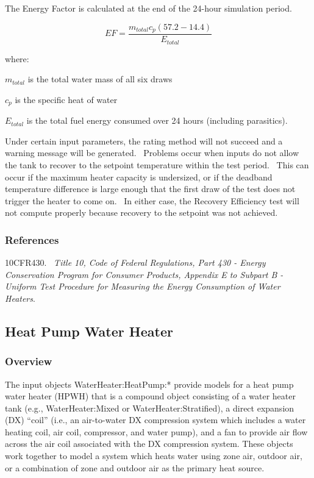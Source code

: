 The Energy Factor is calculated at the end of the 24-hour simulation period.

\begin{equation}
EF = \frac{{{m_{total}}{c_p}\left( {57.2 - 14.4} \right)}}{{{E_{total}}}}
\end{equation}

where:

\(m_{total}\) is the total water mass of all six draws

\(c_{p}\) is the specific heat of water

\(E_{total}\) is the total fuel energy consumed over 24 hours (including parasitics).

Under certain input parameters, the rating method will not succeed and a warning message will be generated.~ Problems occur when inputs do not allow the tank to recover to the setpoint temperature within the test period.~ This can occur if the maximum heater capacity is undersized, or if the deadband temperature difference is large enough that the first draw of the test does not trigger the heater to come on.~ In either case, the Recovery Efficiency test will not compute properly because recovery to the setpoint was not achieved.

\subsubsection{References}\label{references-053}

10CFR430.~ \emph{Title 10, Code of Federal Regulations, Part 430 - Energy Conservation Program for Consumer Products, Appendix E to Subpart B - Uniform Test Procedure for Measuring the Energy Consumption of Water Heaters}.

\subsection{Heat Pump Water Heater}\label{heat-pump-water-heater}

\subsubsection{Overview}\label{overview-029}

The input objects WaterHeater:HeatPump:* provide models for a heat pump water heater (HPWH) that is a compound object consisting of a water heater tank (e.g., WaterHeater:Mixed or WaterHeater:Stratified), a direct expansion (DX) ``coil'' (i.e., an air-to-water DX compression system which includes a water heating coil, air coil, compressor, and water pump), and a fan to provide air flow across the air coil associated with the DX compression system. These objects work together to model a system which heats water using zone air, outdoor air, or a combination of zone and outdoor air as the primary heat source.

